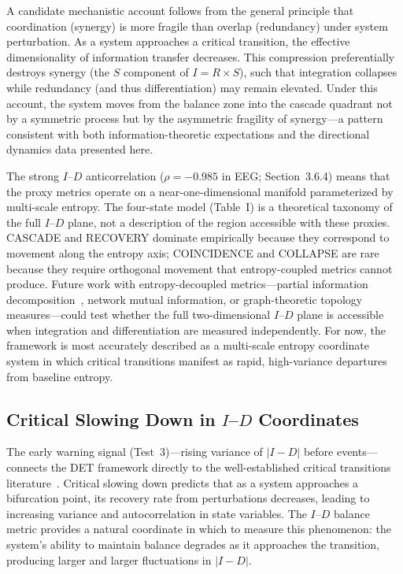 \documentclass[aip,cha,reprint,amsmath,amssymb,final,floatfix]{revtex4-2}
\begin{document}
A candidate mechanistic account follows from the general principle that coordination (synergy) is more fragile than overlap (redundancy) under system perturbation. As a system approaches a critical transition, the effective dimensionality of information transfer decreases. This compression preferentially destroys synergy (the $S$ component of $I = R \times S$), such that integration collapses while redundancy (and thus differentiation) may remain elevated. Under this account, the system moves from the balance zone into the cascade quadrant not by a symmetric process but by the asymmetric fragility of synergy---a pattern consistent with both information-theoretic expectations and the directional dynamics data presented here.

The strong $I$--$D$ anticorrelation ($\rho = -0.985$ in EEG; Section~3.6.4) means that the proxy metrics operate on a near-one-dimensional manifold parameterized by multi-scale entropy. The four-state model (Table~I) is a theoretical taxonomy of the full $I$--$D$ plane, not a description of the region accessible with these proxies. CASCADE and RECOVERY dominate empirically because they correspond to movement along the entropy axis; COINCIDENCE and COLLAPSE are rare because they require orthogonal movement that entropy-coupled metrics cannot produce. Future work with entropy-decoupled metrics---partial information decomposition~\cite{williams2010}, network mutual information, or graph-theoretic topology measures---could test whether the full two-dimensional $I$--$D$ plane is accessible when integration and differentiation are measured independently. For now, the framework is most accurately described as a multi-scale entropy coordinate system in which critical transitions manifest as rapid, high-variance departures from baseline entropy.

\subsection{Critical Slowing Down in $I$--$D$ Coordinates}

The early warning signal (Test~3)---rising variance of $|I - D|$ before events---connects the DET framework directly to the well-established critical transitions literature~\cite{scheffer2009,dakos2012}. Critical slowing down predicts that as a system approaches a bifurcation point, its recovery rate from perturbations decreases, leading to increasing variance and autocorrelation in state variables. The $I$--$D$ balance metric provides a natural coordinate in which to measure this phenomenon: the system's ability to maintain balance degrades as it approaches the transition, producing larger and larger fluctuations in $|I - D|$.
\end{document}
